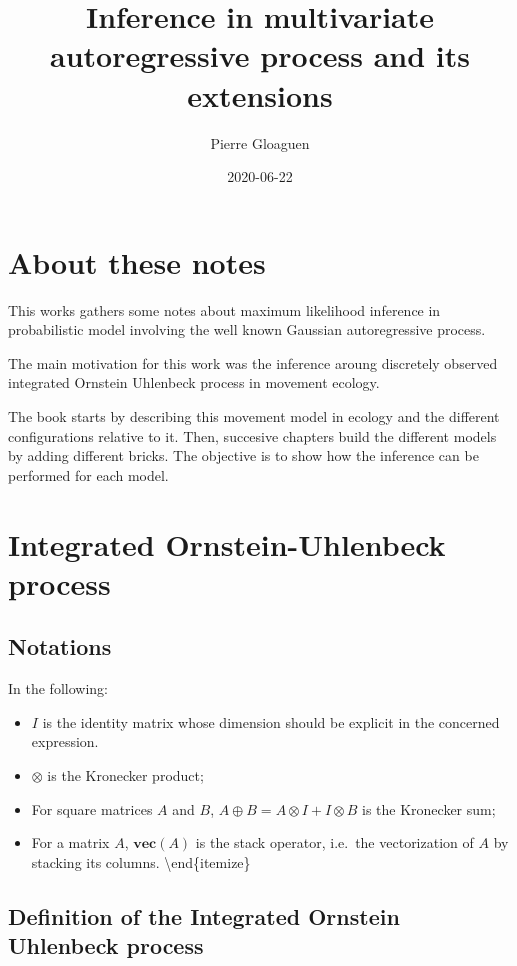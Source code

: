 \documentclass[]{book}
\title{Inference in multivariate autoregressive process and its extensions}
\author{Pierre Gloaguen}
\date{2020-06-22}
\providecommand{\tightlist}{%
  \setlength{\itemsep}{0pt}\setlength{\parskip}{0pt}}
\newcommand{\Vect}[1]{\textbf{vec}\left(#1 \right)}
\begin{document}
\maketitle

{
\setcounter{tocdepth}{1}
\tableofcontents
}
\chapter*{About these notes}\label{about-these-notes}

This works gathers some notes about maximum likelihood inference in
probabilistic model involving the well known Gaussian autoregressive
process.

The main motivation for this work was the inference aroung discretely
observed integrated Ornstein Uhlenbeck process in movement ecology.

The book starts by describing this movement model in ecology and the
different configurations relative to it. Then, succesive chapters build
the different models by adding different bricks. The objective is to
show how the inference can be performed for each model.

\chapter{Integrated Ornstein-Uhlenbeck
process}\label{integrated-ornstein-uhlenbeck-process}

\section{Notations}\label{notations}

In the following:

\begin{itemize}
\tightlist
\item
  \(I\) is the identity matrix whose dimension should be explicit in the
  concerned expression.
\item
  \(\otimes\) is the Kronecker product;
\item
  For square matrices \(A\) and \(B\),
  \(A \oplus B = A\otimes I + I \otimes B\) is the Kronecker sum;
\item
  For a matrix \(A\), \(\Vect A\) is the stack operator, i.e.~the
  vectorization of \(A\) by stacking its columns.
  \textbackslash{}end\{itemize\}
\end{itemize}

\section{Definition of the Integrated Ornstein Uhlenbeck
process}\label{definition-of-the-integrated-ornstein-uhlenbeck-process}
\end{document}

